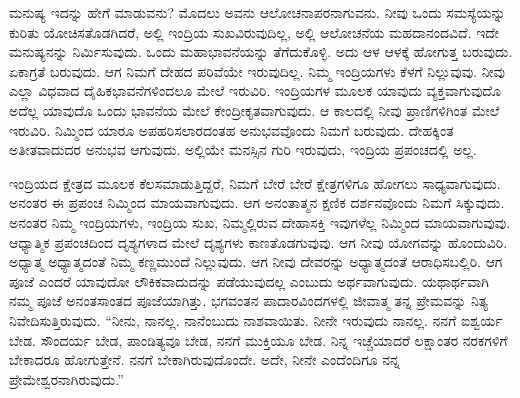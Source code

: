 ಮನುಷ್ಯ ಇದನ್ನು ಹೇಗೆ ಮಾಡುವನು? ಮೊದಲು ಅವನು ಆಲೋಚನಾಪರನಾಗುವನು. ನೀವು ಒಂದು ಸಮಸ್ಯೆಯನ್ನು ಕುರಿತು ಯೋಚಿಸತೊಡಗಿದರೆ, ಅಲ್ಲಿ ಇಂದ್ರಿಯ ಸುಖವಿರುವುದಿಲ್ಲ, ಅಲ್ಲಿ ಆಲೋಚನೆಯ ಮಹದಾನಂದವಿದೆ. ಇದೇ ಮನುಷ್ಯನನ್ನು ನಿರ್ಮಿಸುವುದು. ಒಂದು ಮಹಾಭಾವನೆಯನ್ನು ತೆಗೆದುಕೊಳ್ಳಿ. ಅದು ಆಳ ಆಳಕ್ಕೆ ಹೋಗುತ್ತ ಬರುವುದು. ಏಕಾಗ್ರತೆ ಬರುವುದು. ಆಗ ನಿಮಗೆ ದೇಹದ ಪರಿವೆಯೇ ಇರುವುದಿಲ್ಲ. ನಿಮ್ಮ ಇಂದ್ರಿಯಗಳು ಕೆಳಗೆ ನಿಲ್ಲುವುವು. ನೀವು ಎಲ್ಲಾ ವಿಧವಾದ ದೈಹಿಕಭಾವನೆಗಳಿಂದಲೂ ಮೇಲೆ ಇರುವಿರಿ. ಇಂದ್ರಿಯಗಳ ಮೂಲಕ ಯಾವುದು ವ್ಯಕ್ತವಾಗುವುದೊ ಅದೆಲ್ಲ ಯಾವುದೊ ಒಂದು ಭಾವನೆಯ ಮೇಲೆ ಕೇಂದ್ರೀಕೃತವಾಗುವುದು. ಆ ಕಾಲದಲ್ಲಿ ನೀವು ಪ್ರಾಣಿಗಳಿಗಿಂತ ಮೇಲೆ ಇರುವಿರಿ. ನಿಮ್ಮಿಂದ ಯಾರೂ ಅಪಹರಿಸಲಾರದಂತಹ ಅನುಭವವೊಂದು ನಿಮಗೆ ಬರುವುದು. ದೇಹಕ್ಕಿಂತ ಅತೀತವಾದುದರ ಅನುಭವ ಆಗುವುದು. ಅಲ್ಲಿಯೇ ಮನಸ್ಸಿನ ಗುರಿ ಇರುವುದು, ಇಂದ್ರಿಯ ಪ್ರಪಂಚದಲ್ಲಿ ಅಲ್ಲ.

ಇಂದ್ರಿಯದ ಕ್ಷೇತ್ರದ ಮೂಲಕ ಕೆಲಸಮಾಡುತ್ತಿದ್ದರೆ, ನಿಮಗೆ ಬೇರೆ ಬೇರೆ ಕ್ಷೇತ್ರಗಳಿಗೂ ಹೋಗಲು ಸಾಧ್ಯವಾಗುವುದು. ಅನಂತರ ಈ ಪ್ರಪಂಚ ನಿಮ್ಮಿಂದ ಮಾಯವಾಗುವುದು. ಆಗ ಅನಂತಾತ್ಮನ ಕ್ಷಣಿಕ ದರ್ಶನವೊಂದು ನಿಮಗೆ ಸಿಕ್ಕುವುದು. ಅನಂತರ ನಿಮ್ಮ ಇಂದ್ರಿಯಗಳು, ಇಂದ್ರಿಯ ಸುಖ, ನಿಮ್ಮಲ್ಲಿರುವ ದೇಹಾಸಕ್ತಿ ಇವುಗಳೆಲ್ಲ ನಿಮ್ಮಿಂದ ಮಾಯವಾಗುವುವು. ಆಧ್ಯಾತ್ಮಿಕ ಪ್ರಪಂಚದಿಂದ ದೃಶ್ಯಗಳಾದ ಮೇಲೆ ದೃಶ್ಯಗಳು ಕಾಣತೊಡಗುವುವು. ಆಗ ನೀವು ಯೋಗವನ್ನು ಹೊಂದುವಿರಿ. ಅಧ್ಯಾತ್ಮ ಅಧ್ಯಾತ್ಮದಂತೆ ನಿಮ್ಮ ಕಣ್ಣಮುಂದೆ ನಿಲ್ಲುವುದು. ಆಗ ನೀವು ದೇವರನ್ನು ಅಧ್ಯಾತ್ಮದಂತೆ ಆರಾಧಿಸಬಲ್ಲಿರಿ. ಆಗ ಪೂಜೆ ಎಂದರೆ ಯಾವುದೋ ಲೌಕಿಕವಾದುದನ್ನು ಪಡೆಯುವುದಲ್ಲ ಎಂಬುದು ಅರ್ಥವಾಗುವುದು. ಯಥಾರ್ಥವಾಗಿ ನಮ್ಮ ಪೂಜೆ ಅನಂತಸಾಂತದ ಪೂಜೆಯಾಗಿತ್ತು. ಭಗವಂತನ ಪಾದಾರವಿಂದಗಳಲ್ಲಿ ಜೀವಾತ್ಮ ತನ್ನ ಪ್ರೇಮವನ್ನು ನಿತ್ಯ ನಿವೇದಿಸುತ್ತಿರುವುದು. “ನೀನು, ನಾನಲ್ಲ. ನಾನೆಂಬುದು ನಾಶವಾಯಿತು. ನೀನೇ ಇರುವುದು ನಾನಲ್ಲ. ನನಗೆ ಐಶ್ವರ್ಯ ಬೇಡ. ಸೌಂದರ್ಯ ಬೇಡ, ಪಾಂಡಿತ್ಯವೂ ಬೇಡ, ನನಗೆ ಮುಕ್ತಿಯೂ ಬೇಡ. ನಿನ್ನ ಇಚ್ಚೆಯಾದರೆ ಲಕ್ಷಾಂತರ ನರಕಗಳಿಗೆ ಬೇಕಾದರೂ ಹೋಗುತ್ತೇನೆ. ನನಗೆ ಬೇಕಾಗಿರುವುದೊಂದೇ. ಅದೇ, ನೀನೇ ಎಂದೆಂದಿಗೂ ನನ್ನ ಪ್ರೇಮೇಶ್ವರನಾಗಿರುವುದು.”

